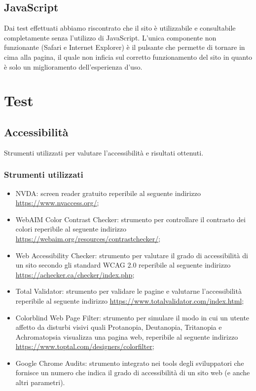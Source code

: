 \documentclass[12pt]{article}
\begin{document}
	\subsection{JavaScript}
	Dai test effettuati abbiamo riscontrato che il sito è utilizzabile e consultabile completamente senza l'utilizzo di JavaScript. L'unica componente non funzionante (Safari e Internet Explorer) è il pulsante che permette di tornare in cima alla pagina, il quale non inficia sul corretto funzionamento del sito in quanto è solo un miglioramento dell'esperienza d'uso.
	
	\section{Test}
	\subsection{Accessibilità}
	Strumenti utilizzati per valutare l'accessibilità e risultati ottenuti.
	\subsubsection{Strumenti utilizzati}
		\begin{itemize}
			\item NVDA: screen reader gratuito reperibile al seguente indirizzo \url{https://www.nvaccess.org/};
			\item WebAIM Color Contrast Checker: strumento per controllare il contrasto dei colori reperibile al seguente indirizzo \url{https://webaim.org/resources/contrastchecker/};
			\item Web Accessibility Checker: strumento per valutare il grado di accessibilità di un sito secondo gli standard WCAG 2.0 reperibile al seguente indirizzo \url{https://achecker.ca/checker/index.php};
			\item Total Validator: strumento per validare le pagine e valutarne l'accessibilità reperibile al seguente indirizzo \url{https://www.totalvalidator.com/index.html};
			\item Colorblind Web Page Filter: strumento per simulare il modo in cui un utente affetto da disturbi visivi quali Protanopia, Deutanopia, Tritanopia e Achromatopsia visualizza una pagina web, reperibile al seguente indirizzo \url{https://www.toptal.com/designers/colorfilter};
			\item Google Chrome Audits: strumento integrato nei tools degli sviluppatori che fornisce un numero che indica il grado di accessibilità di un sito web (e anche altri parametri).
		\end{itemize}
\end{document}
